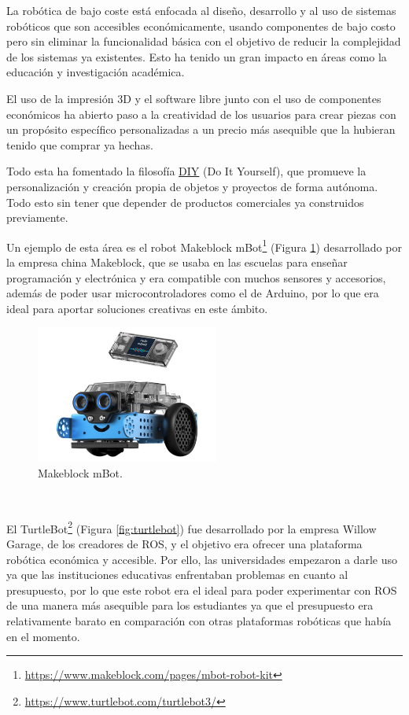 La robótica de bajo coste está enfocada al diseño, desarrollo y al uso de sistemas robóticos que son accesibles económicamente, usando componentes de bajo costo pero sin eliminar la funcionalidad básica con el objetivo de reducir la complejidad de los sistemas ya existentes. Esto ha tenido un gran impacto en áreas como la educación y investigación académica.

El uso de la impresión 3D y el software libre junto con el uso de componentes económicos ha abierto paso a la creatividad de los usuarios para crear piezas con un propósito específico personalizadas a un precio más asequible que la hubieran tenido que comprar ya hechas.


Todo esta ha fomentado la filosofía \hyperlink{DIY}{DIY} (Do It Yourself), que promueve la personalización y creación propia de objetos y proyectos de forma autónoma. Todo esto sin tener que depender de productos comerciales ya construidos previamente.

Un ejemplo de esta área es el robot Makeblock mBot\footnote{\url{https://www.makeblock.com/pages/mbot-robot-kit}} (Figura \ref{fig:mbot-2}) desarrollado por la empresa china Makeblock, que se usaba en las escuelas para enseñar programación y electrónica y era compatible con muchos sensores y accesorios, además de poder usar microcontroladores como el de Arduino, por lo que era ideal para aportar soluciones creativas en este ámbito.

\begin{figure} [h!]
  \begin{center}
    \includegraphics[width=6cm]{figs/mbot-2.jpg}
  \end{center}
  \caption{Makeblock mBot.}
  \label{fig:mbot-2}
\end{figure}\


El TurtleBot\footnote{\url{https://www.turtlebot.com/turtlebot3/}} (Figura \ref{fig:turtlebot}) fue desarrollado por la empresa Willow Garage, de los creadores de ROS, y el objetivo era ofrecer una plataforma robótica económica y accesible. Por ello, las universidades empezaron a darle uso ya que las instituciones educativas enfrentaban problemas en cuanto al presupuesto, por lo que este robot era el ideal para poder experimentar con ROS de una manera más asequible para los estudiantes ya que el presupuesto era relativamente barato en comparación con otras plataformas robóticas que había en el momento.

